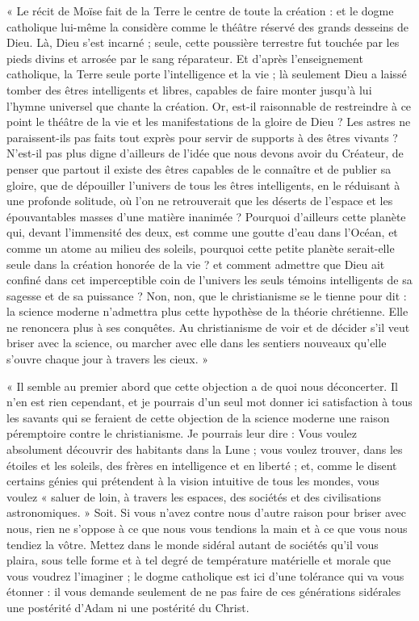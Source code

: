 \documentclass[a4paper, 11pt, oneside]{article}
\begin{document}
« Le récit de Moïse fait de la Terre le centre de toute la création : et le dogme catholique lui-même la considère comme le théâtre réservé des grands desseins de Dieu. Là, Dieu s'est incarné ; seule, cette poussière terrestre fut touchée par les pieds divins et arrosée par le sang réparateur. Et d'après l'enseignement catholique, la Terre seule porte l'intelligence et la vie ; là seulement Dieu a laissé tomber des êtres intelligents et libres, capables de faire monter jusqu'à lui l'hymne universel que chante la création. Or, est-il raisonnable de restreindre à ce point le théâtre de la vie et les manifestations de la gloire de Dieu ? Les astres ne paraissent-ils pas faits tout exprès pour servir de supports à des êtres vivants ? N'est-il pas plus digne d'ailleurs de l'idée que nous devons avoir du Créateur, de penser que partout il existe des êtres capables de le connaître et de publier sa gloire, que de dépouiller l'univers de tous les êtres intelligents, en le réduisant à une profonde solitude, où l'on ne retrouverait que les déserts de l'espace et les épouvantables masses d'une matière inanimée ? Pourquoi d'ailleurs cette planète qui, devant l'immensité des deux, est comme une goutte d'eau dans l'Océan, et comme un atome au milieu des soleils, pourquoi cette petite planète serait-elle seule dans la création honorée de la vie ? et comment admettre que Dieu ait confiné dans cet imperceptible coin de l'univers les seuls témoins intelligents de sa sagesse et de sa puissance ? Non, non, que le christianisme se le tienne pour dit : la science moderne n'admettra plus cette hypothèse de la théorie chrétienne. Elle ne renoncera plus à ses conquêtes. Au christianisme de voir et de décider s'il veut briser avec la science, ou marcher avec elle dans les sentiers nouveaux qu'elle s'ouvre chaque jour à travers les cieux. »

« Il semble au premier abord que cette objection a de quoi nous déconcerter. Il n'en est rien cependant, et je pourrais d'un seul mot donner ici satisfaction à tous les savants qui se feraient de cette objection de la science moderne une raison péremptoire contre le christianisme. Je pourrais leur dire : Vous voulez absolument découvrir des habitants dans la Lune ; vous voulez trouver, dans les étoiles et les soleils, des frères en intelligence et en liberté ; et, comme le disent certains génies qui prétendent à la vision intuitive de tous les mondes, vous voulez « saluer de loin, à travers les espaces, des sociétés et des civilisations astronomiques. » Soit. Si vous n'avez contre nous d'autre raison pour briser avec nous, rien ne s'oppose à ce que nous vous tendions la main et à ce que vous nous tendiez la vôtre. Mettez dans le monde sidéral autant de sociétés qu'il vous plaira, sous telle forme et à tel degré de température matérielle et morale que vous voudrez l'imaginer ; le dogme catholique est ici d'une tolérance qui va vous étonner : il vous demande seulement de ne pas faire de ces générations sidérales une postérité d'Adam ni une postérité du Christ.
\end{document}

